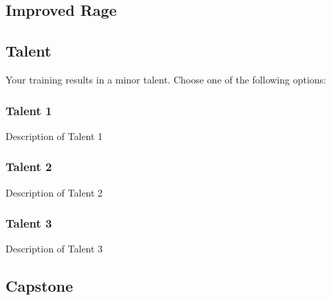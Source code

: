 \vspace{.1 in}

\subsection*{Improved Rage}
\lipsum[1]

\vspace{.1 in}

\subsection*{Talent}
Your training results in a minor talent. Choose one of the following options:

\subsubsection{Talent 1}
Description of Talent 1

\subsubsection{Talent 2}
Description of Talent 2

\subsubsection{Talent 3}
Description of Talent 3

\vspace{.1 in}

\subsection*{Capstone}
\lipsum[1]